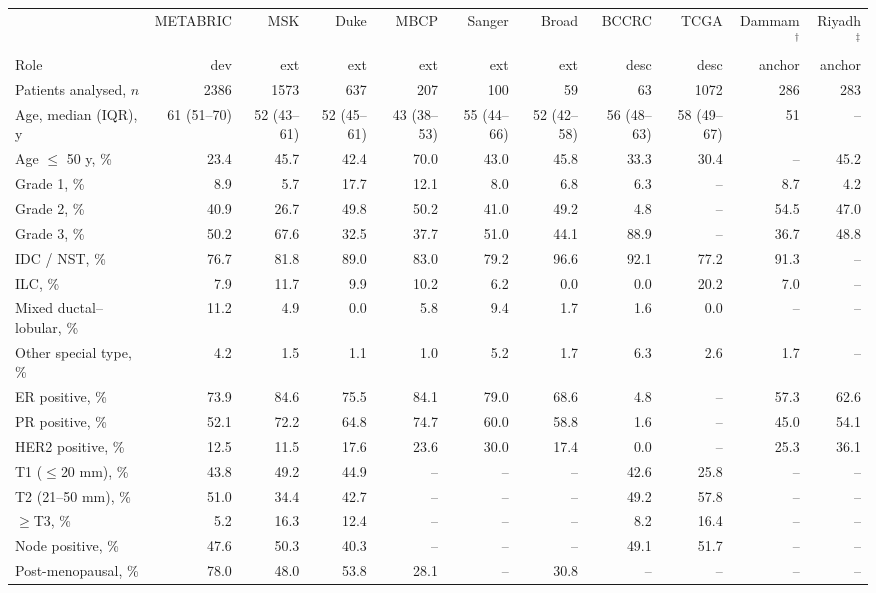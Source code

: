 \begin{tabular}{lrrrrrrrrrr}
\toprule
 & METABRIC & MSK & Duke & MBCP & Sanger & Broad & BCCRC & TCGA & Dammam$^\dagger$ & Riyadh$^\ddagger$ \\
Role & dev & ext & ext & ext & ext & ext & desc & desc & anchor & anchor \\
\midrule
Patients analysed, $n$ & 2386 & 1573 & 637 & 207 & 100 & 59 & 63 & 1072 & 286 & 283 \\
Age, median (IQR), y & 61 (51--70) & 52 (43--61) & 52 (45--61) & 43 (38--53) & 55 (44--66) & 52 (42--58) & 56 (48--63) & 58 (49--67) & 51 & -- \\
Age $\le$ 50 y, \% & 23.4 & 45.7 & 42.4 & 70.0 & 43.0 & 45.8 & 33.3 & 30.4 & -- & 45.2 \\
Grade 1, \% & 8.9 & 5.7 & 17.7 & 12.1 & 8.0 & 6.8 & 6.3 & -- & 8.7 & 4.2 \\
Grade 2, \% & 40.9 & 26.7 & 49.8 & 50.2 & 41.0 & 49.2 & 4.8 & -- & 54.5 & 47.0 \\
Grade 3, \% & 50.2 & 67.6 & 32.5 & 37.7 & 51.0 & 44.1 & 88.9 & -- & 36.7 & 48.8 \\
IDC / NST, \% & 76.7 & 81.8 & 89.0 & 83.0 & 79.2 & 96.6 & 92.1 & 77.2 & 91.3 & -- \\
ILC, \% & 7.9 & 11.7 & 9.9 & 10.2 & 6.2 & 0.0 & 0.0 & 20.2 & 7.0 & -- \\
Mixed ductal--lobular, \% & 11.2 & 4.9 & 0.0 & 5.8 & 9.4 & 1.7 & 1.6 & 0.0 & -- & -- \\
Other special type, \% & 4.2 & 1.5 & 1.1 & 1.0 & 5.2 & 1.7 & 6.3 & 2.6 & 1.7 & -- \\
ER positive, \% & 73.9 & 84.6 & 75.5 & 84.1 & 79.0 & 68.6 & 4.8 & -- & 57.3 & 62.6 \\
PR positive, \% & 52.1 & 72.2 & 64.8 & 74.7 & 60.0 & 58.8 & 1.6 & -- & 45.0 & 54.1 \\
HER2 positive, \% & 12.5 & 11.5 & 17.6 & 23.6 & 30.0 & 17.4 & 0.0 & -- & 25.3 & 36.1 \\
T1 ($\le$20 mm), \% & 43.8 & 49.2 & 44.9 & -- & -- & -- & 42.6 & 25.8 & -- & -- \\
T2 (21--50 mm), \% & 51.0 & 34.4 & 42.7 & -- & -- & -- & 49.2 & 57.8 & -- & -- \\
$\ge$T3, \% & 5.2 & 16.3 & 12.4 & -- & -- & -- & 8.2 & 16.4 & -- & -- \\
Node positive, \% & 47.6 & 50.3 & 40.3 & -- & -- & -- & 49.1 & 51.7 & -- & -- \\
Post-menopausal, \% & 78.0 & 48.0 & 53.8 & 28.1 & -- & 30.8 & -- & -- & -- & -- \\
\bottomrule
\end{tabular}